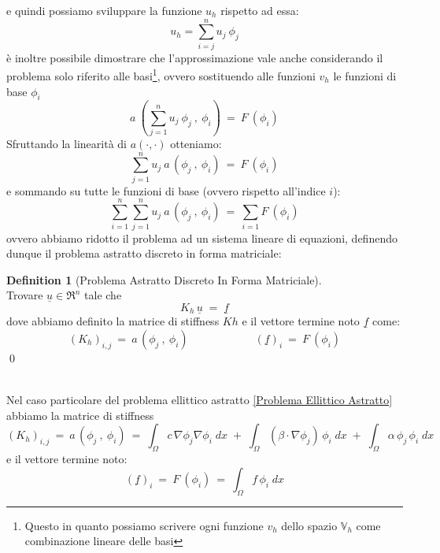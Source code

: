 \documentclass[12pt,a4paper]{report}
\theoremstyle{theorem}
\theoremstyle{theorem}
\theoremstyle{definition}
\newtheorem{definition}{Definition}[section]
\begin{document}
e quindi possiamo sviluppare la funzione $u_{h}$ rispetto ad essa:
\[ u_{h} = \sum_{i = j}^{n} u_{j} \ \phi_{j} \]
è inoltre possibile dimostrare che l'approssimazione vale anche considerando il problema solo riferito alle basi\footnote{Questo in quanto possiamo scrivere ogni funzione $v_{h}$ dello spazio $\mathbb{V}_{h}$ come combinazione lineare delle basi}, ovvero sostituendo alle funzioni $v_{h}$ le funzioni di base $\phi_{i}$
\[ a \ \left( \sum_{j = 1}^{n} u_{j} \ \phi_{j} \ , \ \phi_{i} \right) \ = \ F \ \left(  \phi_{i} \right) \]
Sfruttando la linearità di $a(\cdot,\cdot)$ otteniamo:
\[ \sum_{j = 1}^{n} u_{j} \ a \, \left( \phi_{j} \ , \ \phi_{i} \right) \ = \ F \ \left(  \phi_{i} \right) \]
e sommando su tutte le funzioni di base (ovvero rispetto all'indice $i$):
\[ \sum_{i = 1}^{n} \sum_{j = 1}^{n} u_{j} \ a \, \left( \phi_{j} \ , \ \phi_{i} \right) \ = \ \sum_{i = 1} F \ \left(  \phi_{i} \right) \]
ovvero abbiamo ridotto il problema ad un sistema lineare di equazioni, definendo dunque il problema astratto discreto in forma matriciale:
\begin{definition} [Problema Astratto Discreto In Forma Matriciale]  \label{Problema Astratto Discreto In Forma Matriciale}
\hfill \\
Trovare $\underline{u}  \in \Re^{n}$ tale che
\[ K_{h} \, \underline{u} \; = \; \underline{f} \]
dove abbiamo definito la matrice di stiffness $Kh$  \label{Matrice Di Stiffness} e il vettore termine noto $\underline{f}$ come:
\[ (K_{h})_{i,j} \ = \ a \, \left( \phi_{j} \ , \ \phi_{i} \right) \qquad \qquad \qquad (\underline{f})_{i} \ = \ F \ \left(  \phi_{i} \right) \]
\qed
\end{definition}
\hfill \\
Nel caso particolare del problema ellittico astratto \ref{Problema Ellittico Astratto} abbiamo la matrice di stiffness  \label{Matrice Di Stiffness Problema Ellittico}
\[ (K_{h})_{i,j} \ = \ a \, \left( \phi_{j} \ , \ \phi_{i} \right) \ = \ \int_{\Omega}{c \, \nabla \phi_{j} \nabla \phi_{i} \; dx} \; + \; \int_{\Omega}{(\beta \cdot \nabla \phi_{j}) \, \phi_{i} \; dx} \; + \; \int_{\Omega}{\alpha \, \phi_{j} \, \phi_{i} \; dx} \]
e il vettore termine noto:
\[ (\underline{f})_{i} \ = \ F \ \left(  \phi_{i} \right) \ = \ \int_{\Omega}{f \, \phi_{i} \; dx} \]
\end{document}
